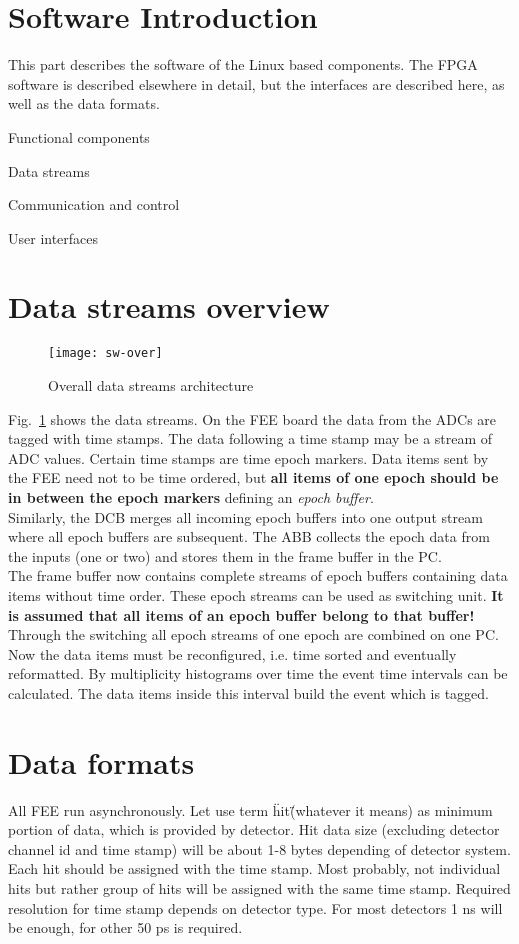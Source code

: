 \section{Software Introduction}
This part describes the software of the Linux based components.
The FPGA software is described elsewhere in detail, but the
interfaces are described here, as well as the data formats.
\begin{compactitem}[$\diamond$]
\item Functional components
\item Data streams
\item Communication and control
\item User interfaces
\end{compactitem}

\section{Data streams overview}
\begin{figure}[htb]
\centering\texttt{[image: sw-over]} %
\caption{Overall data streams architecture}
\label{fig:SW-over} %
\end{figure}

Fig.~\ref{fig:SW-over} shows the data streams. On the FEE board the data from
the ADCs are tagged with time stamps. The data following a time stamp may be
a stream of ADC values. Certain time stamps are time epoch markers.
Data items sent by the FEE need not to be time ordered, but {\bf all items of one epoch
should be in between the epoch markers} defining an {\sl epoch buffer}.\\
Similarly, the DCB merges all incoming epoch buffers into one output stream where
all epoch buffers are subsequent.
The ABB collects the epoch data from the inputs (one or two) and stores them in the
frame buffer in the PC.\\
The frame buffer now contains complete streams of epoch buffers containing data
items without time order. These epoch streams can be used as switching unit.
{\bf It is assumed that all items of an epoch buffer belong to that buffer!}
Through the switching all epoch streams of one epoch are combined on one PC.
Now the data items must be reconfigured, i.e. time sorted and eventually reformatted.
By multiplicity histograms over time the event time intervals can be calculated.
The data items inside this interval build the event which is tagged.

\section{Data formats}
All FEE run asynchronously. Let use term \"hit\" (whatever it means) as minimum portion of
data, which is provided by detector. Hit data size (excluding
detector channel id and time stamp) will be about 1-8 bytes depending of detector system.
Each hit should be assigned with the time stamp. Most probably, not individual hits but
rather group of hits will be assigned with the same time stamp. Required resolution
for time stamp depends on detector type. For most detectors 1 ns will be enough, for
other 50 ps is required.

